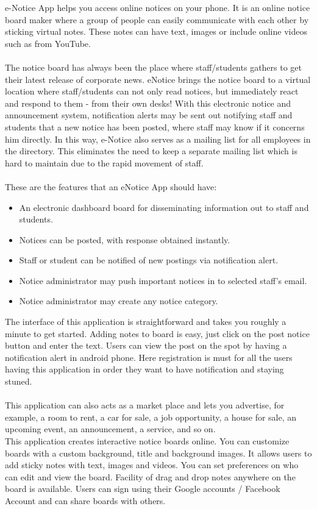 e-Notice App helps you access online notices on your phone. It is an online notice board maker
where a group of people can easily communicate with each other by sticking virtual notes. These
notes can have text, images or include online videos such as from YouTube.\\\\
The notice board has always been the place where staff/students gathers to get their latest release
of corporate news. eNotice brings the notice board to a virtual location where staff/students can
not only read notices, but immediately react and respond to them - from their own desks!
With this electronic notice and announcement system, notification alerts may be sent out notifying
staff and students that a new notice has been posted, where staff may know if it concerns him directly. In this
way, e-Notice also serves as a mailing list for all employees in the directory. This eliminates the
need to keep a separate mailing list which is hard to maintain due to the rapid movement of staff.\\ \\
These are the features that an eNotice App should have:
\begin{itemize}
\item An electronic dashboard board for disseminating information out to staff and students.
\item Notices can be posted, with response obtained instantly.
\item Staff or student can be notified of new postings via notification alert.
\item Notice administrator may push important notices in to selected staff's email.
\item Notice administrator may create any notice category.
\end{itemize}
The interface of this application is straightforward and takes you roughly a minute to get started.
Adding notes to board is easy, just click on the post notice button and enter the text. Users can view the post 
on the spot by having a notification alert in android phone.
Here registration is must for all the users having this application in order they want to have notification and staying stuned.\\ \\
This application can also acts as a market place and lets you advertise, for example, a room to
rent, a car for sale, a job opportunity, a house for sale, an upcoming event, an announcement, a
service, and so on.
\\
This application creates interactive notice boards online. You can customize boards with a
custom background, title and background images. It allows users to add sticky notes with text,
images and videos. You can set preferences on who can edit and view the board. Facility of drag
and drop notes anywhere on the board is available. Users can sign using their Google accounts /
Facebook Account and can share boards with others.

